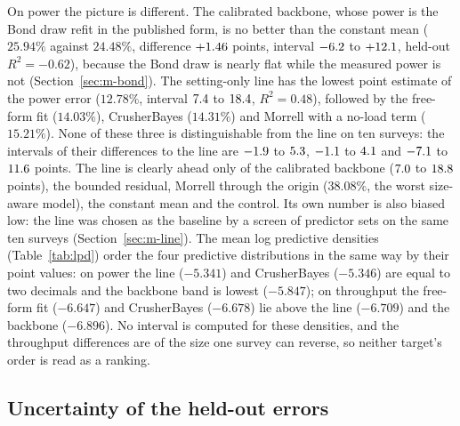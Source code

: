 On power the picture is different. The calibrated backbone, whose power is the Bond draw refit in the published form, is no better than the
constant mean ($25.94\%$ against $24.48\%$, difference $+1.46$ points, interval $-6.2$ to $+12.1$, held-out $R^2=-0.62$),
because the Bond draw is nearly flat while the measured power is not (Section~\ref{sec:m-bond}). The setting-only line has the lowest point
estimate of the power error ($12.78\%$, interval $7.4$ to $18.4$, $R^2=0.48$), followed by the
free-form fit ($14.03\%$), CrusherBayes ($14.31\%$) and Morrell with a no-load term ($15.21\%$). None of these three is distinguishable from the
line on ten surveys: the intervals of their differences to the line are $-1.9$ to $5.3$, $-1.1$ to $4.1$ and
$-7.1$ to $11.6$ points. The line is clearly ahead only of the calibrated backbone ($7.0$ to $18.8$ points),
the bounded residual, Morrell through the origin ($38.08\%$, the worst size-aware model), the constant mean and the control. Its own number is
also biased low: the line was chosen as the baseline by a screen of predictor sets on the same ten surveys (Section~\ref{sec:m-line}). The mean log predictive densities
(Table~\ref{tab:lpd}) order the four predictive distributions in the same way by their point values: on power the line ($-5.341$) and
CrusherBayes ($-5.346$) are equal to two decimals and the backbone band is lowest ($-5.847$); on throughput the free-form fit ($-6.647$) and
CrusherBayes ($-6.678$) lie above the line ($-6.709$) and the backbone ($-6.896$). No interval is computed for these densities, and the
throughput differences are of the size one survey can reverse, so neither target's order is read as a ranking.

\subsection{Uncertainty of the held-out errors}\label{sec:results-uq}

